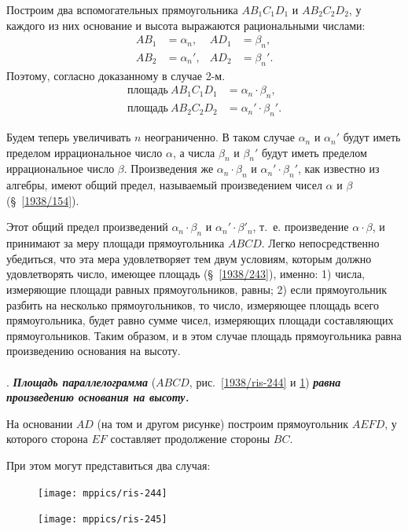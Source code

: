 \documentclass[oneside]{book}
\begin{document}
Построим два вспомогательных прямоугольника $AB_1C_1D_1$ и $AB_2C_2D_2$, у каждого из них основание и высота выражаются рациональными числами:
\begin{align*}
AB_1&=\alpha_n,
&
AD_1&=\beta_n,
\\
AB_2&=\alpha_n',
&
AD_2&=\beta_n'.
\end{align*}
Поэтому, согласно доказанному в случае 2-м.
\begin{align*}
\text{площадь}~AB_1C_1D_1 &= \alpha_n\cdot \beta_n, 
\\
\text{площадь}~AB_2C_2D_2 &= \alpha_n'\cdot \beta_n'. 
\end{align*}

Будем теперь увеличивать $n$ неограниченно.
В таком случае $\alpha_n$ и $\alpha_n'$ будут иметь пределом иррациональное число $\alpha$, а числа $\beta_n$ и $\beta_n'$ будут иметь пределом иррациональное число $\beta$.
Произведения же $\alpha_n\cdot \beta_n$ и  $\alpha_n'\cdot \beta_n'$, как известно из алгебры, имеют общий предел, называемый произведением чисел $\alpha$ и $\beta$ (§~\ref{1938/154}).

Этот общий предел произведений $\alpha_n\cdot \beta_n$ и  $\alpha_n'\cdot  \beta'_n$, т.~е.
произведение $\alpha\cdot \beta$, и принимают за меру площади прямоугольника $ABCD$.
Легко непосредственно убедиться, что эта мера удовлетворяет тем двум условиям, которым должно удовлетворять число, имеющее площадь (§~\ref{1938/243}), именно:
1) числа, измеряющие площади равных прямоугольников, равны;
2) если прямоугольник разбить на несколько прямоугольников, то число, измеряющее площадь всего прямоугольника, будет равно сумме чисел, измеряющих площади составляющих прямоугольников.
Таким образом, и в этом случае площадь прямоугольника равна произведению основания на высоту.

\paragraph{}\label{1938/247}
.
\textbf{\emph{Площадь параллелограмма}} ($ABCD$, рис.~\ref{1938/ris-244} и \ref{1938/ris-245}) \textbf{\emph{равна произведению основания на высоту.}}

На основании $AD$ (на том и другом рисунке) построим прямоугольник $AEFD$, у которого сторона $EF$ составляет продолжение стороны $BC$.

При этом могут представиться два случая:

\begin{figure}[h]
\begin{minipage}{.58\textwidth}
\centering
\texttt{[image: mppics/ris-244]}
\caption{}\label{1938/ris-244}
\end{minipage}
\hfill
\begin{minipage}{.38\textwidth}
\centering
\texttt{[image: mppics/ris-245]}
\caption{}\label{1938/ris-245}
\end{minipage}
\end{figure}
\end{document}

